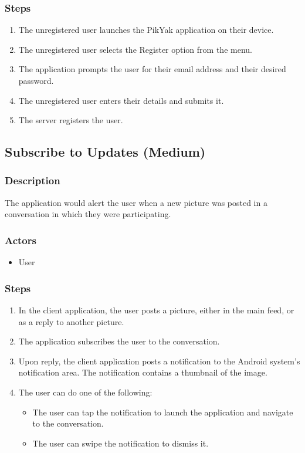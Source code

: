\documentclass[11pt]{scrartcl}
\begin{document}
        \subsubsection{Steps}
            \begin{enumerate}
                \item The unregistered user launches the PikYak application on their device.
                \item The unregistered user selects the Register option from the menu.
                \item The application prompts the user for their email address and their desired password.
                \item The unregistered user enters their details and submits it.
                \item The server registers the user.
            \end{enumerate}

    \subsection{Subscribe to Updates (Medium)}
    \label{sec:subscribe}
        \subsubsection{Description}
            The application would alert the user when a new picture was posted in a conversation in which they were participating.
        \subsubsection{Actors}
            \begin{itemize}
                \item User
            \end{itemize}
        \subsubsection{Steps}
            \begin{enumerate}
                \item In the client application, the user posts a picture, either in the main feed, or as a reply to another picture.
                \item The application subscribes the user to the conversation.
                \item Upon reply, the client application posts a notification to the Android system's notification area.  The notification contains a thumbnail of the image.
                \item The user can do one of the following:
                \begin{itemize}
                    \item The user can tap the notification to launch the application and navigate to the conversation.
                    \item The user can swipe the notification to dismiss it.
                \end{itemize}
            \end{enumerate}
\end{document}

